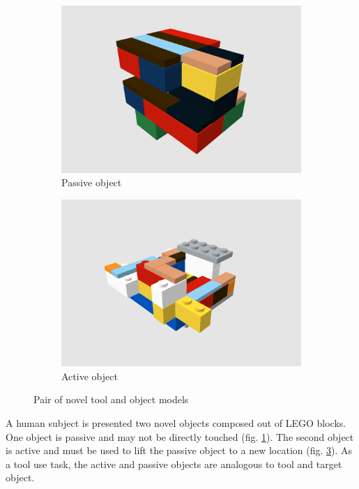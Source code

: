 \documentclass[11]{article}
\begin{document}
\begin{figure}[!h]
  \centering
  \begin{subfigure}{0.49\textwidth}
    \includegraphics[width=1\linewidth]{./figures/obj51.png}
    \caption{Passive object}
    \label{fig:obj51}
  \end{subfigure}
  \begin{subfigure}{0.49\textwidth}
    \includegraphics[width=1\linewidth]{./figures/obj52.png}
    \caption{Active object}
    \label{fig:obj52}
  \end{subfigure}
  \caption{Pair of novel tool and object models}
\end{figure}

A human subject is presented two novel objects composed out of LEGO blocks.
One object is passive and may not be directly touched (fig. \ref{fig:obj51}).
The second object is active and must be used to lift the passive object to a new location (fig. \ref{fig:obj52}).
As a tool use task, the active and passive objects are analogous to tool and target object.
\end{document}
